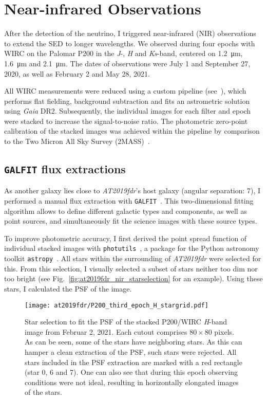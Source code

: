 \section{Near-infrared Observations}\label{nir_reductions}
After the detection of the neutrino, I triggered near-infrared (NIR) observations to extend the SED to longer wavelengths. We observed during four epochs with WIRC on the Palomar P200 in the \textit{J}-, \textit{H} and \textit{Ks}-band, centered on \SI{1.2}{\micro\m}, \SI{1.6}{\micro\m} and \SI{2.1}{\micro\m}. The dates of observations were July 1 and September 27, 2020, as well as February 2 and May 28, 2021.

All WIRC measurements were reduced using a custom pipeline (see~), which performs flat fielding, background subtraction and fits an astrometric solution using \textit{Gaia} DR2. Subsequently, the individual images for each filter and epoch were stacked to increase the signal-to-noise ratio. The photometric zero-point calibration of the stacked images was achieved within the pipeline by comparison to the Two Micron All Sky Survey (2MASS)~.

\subsection{\texttt{GALFIT} flux extractions}

As another galaxy lies close to \emph{AT2019fdr}'s host galaxy (angular separation: \SI{7}{\arcsec}), I performed a manual flux extraction with \texttt{GALFIT}~. This two-dimensional fitting algorithm allows to define different galactic types and components, as well as point sources, and simultaneously fit the science images with these source types.

To improve photometric accuracy, I first derived the point spread function of individual stacked images with \texttt{photutils}~, a package for the Python astronomy toolkit \texttt{astropy}~. All stars within the surrounding of \emph{AT2019fdr} were selected for this. From this selection, I visually selected a subset of stars neither too dim nor too bright (see Fig.~\ref{fig:at2019fdr_nir_starselection} for an example). Using these stars, I calculated the PSF of the image.

\begin{figure*}[htb]
    \texttt{[image: at2019fdr/P200\_third\_epoch\_H\_stargrid.pdf]}
    \caption[P200 \textit{H}-band star selection]{Star selection to fit the PSF of the stacked P200/WIRC \textit{H}-band image from Februar 2, 2021. Each cutout comprises $80\times80$ pixels. As can be seen, some of the stars have neighboring stars. As this can hamper a clean extraction of the PSF, such stars were rejected. All stars included in the PSF extraction are marked with a red rectangle (star 0, 6 and 7). One can also see that during this epoch observing conditions were not ideal, resulting in horizontally elongated images of the stars.}
\end{figure*}

